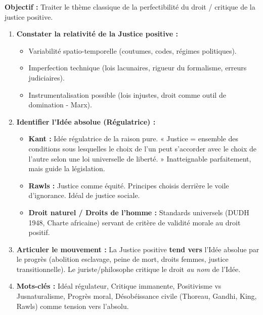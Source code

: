 \documentclass[11pt]{article}
\newcommand{\cle}[1]{{\popxbold\color{popdark}#1}}
\begin{document}
\begin{methode}
    \textbf{Objectif :} Traiter le thème classique de la perfectibilité du droit / critique de la justice positive.
    \begin{enumerate}
        \item \textbf{Constater la relativité de la Justice positive :}
            \begin{itemize}
                \item Variabilité spatio-temporelle (coutumes, codes, régimes politiques).
                \item Imperfection technique (lois lacunaires, rigueur du formalisme, erreurs judiciaires).
                \item Instrumentalisation possible (lois injustes, droit comme outil de domination - Marx).
            \end{itemize}
        \item \textbf{Identifier l'Idée absolue (Régulatrice) :}
            \begin{itemize}
                \item \textbf{Kant :} \cle{Idée régulatrice} de la raison pure. « Justice = ensemble des conditions sous lesquelles le choix de l'un peut s'accorder avec le choix de l'autre selon une loi universelle de liberté. » Inatteignable parfaitement, mais guide la législation.
                \item \textbf{Rawls :} \cle{Justice comme équité}. Principes choisis derrière le \cle{voile d'ignorance}. Idéal de justice sociale.
                \item \textbf{Droit naturel / Droits de l'homme :} Standards universels (DUDH 1948, Charte africaine) servant de \cle{critère de validité morale} au droit positif.
            \end{itemize}
        \item \textbf{Articuler le mouvement :} La Justice positive \textbf{tend vers} l'Idée absolue par le \cle{progrès} (abolition esclavage, peine de mort, droits femmes, justice transitionnelle). Le juriste/philosophe critique le droit \emph{au nom} de l'Idée.
        \item \textbf{Mots-clés :} \cle{Idéal régulateur}, \cle{Critique immanente}, \cle{Positivisme vs Jusnaturalisme}, \cle{Progrès moral}, \cle{Désobéissance civile} (Thoreau, Gandhi, King, Rawls) comme tension vers l'absolu.
    \end{enumerate}
\end{methode}
\end{document}
